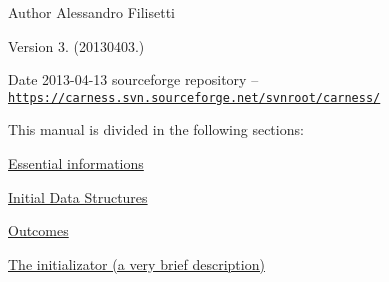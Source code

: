 \begin{DoxyAuthor}{Author}
Alessandro Filisetti 
\end{DoxyAuthor}
\begin{DoxyVersion}{Version}
3. (20130403.) 
\end{DoxyVersion}
\begin{DoxyDate}{Date}
2013-\/04-\/13 sourceforge repository -- \href{https://carness.svn.sourceforge.net/svnroot/carness/}{\tt https\-://carness.\-svn.\-sourceforge.\-net/svnroot/carness/}
\end{DoxyDate}
This manual is divided in the following sections\-:
\begin{DoxyItemize}
\item \hyperlink{intro}{Essential informations}
\item \hyperlink{pageInitStr}{Initial Data Structures}
\item \hyperlink{pageoutcomes}{Outcomes}
\item \hyperlink{pageInitializator}{The initializator (a very brief description)} 
\end{DoxyItemize}